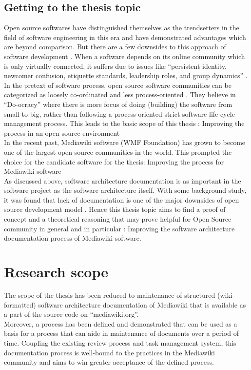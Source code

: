 {\subsection{Getting to the thesis topic}
\indent Open source softwares have distinguished themselves as the trendsetters in the field of software engineering in this era and have demonstrated advantages which are beyond comparison. But there are a few downsides to this approach of software development \cite{Scacchi2007}. When a software depends on its online community which is only virtually connected, it suffers due to issues like  \enquote{persistent identity, newcomer confusion, etiquette standards, leadership roles, and group dynamics} \cite{Kim:2000:CBW:518514}. In the pretext of software process, open source software communities can be categorized as loosely co-ordinated and less process-oriented \cite{Zhao2003}. They believe in \enquote{Do-ocracy} where there is more focus of doing (building) the software from small to big, rather than following a process-oriented strict software life-cycle management process. This leads to the basic scope of this thesis : Improving the process in an open source environment
\\\indent In the recent past, Mediawiki software (WMF Foundation) has grown to become one of the largest open source communities in the world. This prompted the choice for the candidate software for the thesis: Improving the process for Mediawiki software
\\\indent As discussed above, software architecture documentation is as important in the software project as the software architecture itself. With some background study, it was found that lack of documentation is one of the major downsides of open source development model \cite{6923128} \cite{Zhao2003}. Hence this thesis topic aims to find a proof of concept  and a theoretical reasoning that may prove helpful for Open Source community in general and in particular : Improving the software architecture documentation process of Mediawiki software.

\section{Research scope}\label{sec:scope}
The scope of the thesis has been reduced to maintenance of structured (wiki-formatted) software architecture documentation of Mediawiki that is available as a part of the source code on \enquote{mediawiki.org}.
\\\indent Moreover, a process has been defined and demonstrated that can be used as a basis for a process that can aide in maintenance of documents over a period of time. Coupling the existing review process and task management system, this documentation process is well-bound to the practices in the Mediawiki community and aims to win greater acceptance of the defined process. \cite{6923128}

}
